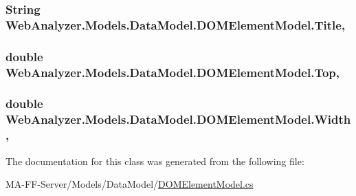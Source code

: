 \subsubsection[{Title}]{\setlength{\rightskip}{0pt plus 5cm}String Web\+Analyzer.\+Models.\+Data\+Model.\+D\+O\+M\+Element\+Model.\+Title\hspace{0.3cm}{\ttfamily [get]}, {\ttfamily [set]}}\label{class_web_analyzer_1_1_models_1_1_data_model_1_1_d_o_m_element_model_a10a1c3ec9fceca5b4745cae7f9647c74}
\hypertarget{class_web_analyzer_1_1_models_1_1_data_model_1_1_d_o_m_element_model_a1f17dcaf6e924292f3b6a8ade726941d}{}
\subsubsection[{Top}]{\setlength{\rightskip}{0pt plus 5cm}double Web\+Analyzer.\+Models.\+Data\+Model.\+D\+O\+M\+Element\+Model.\+Top\hspace{0.3cm}{\ttfamily [get]}, {\ttfamily [set]}}\label{class_web_analyzer_1_1_models_1_1_data_model_1_1_d_o_m_element_model_a1f17dcaf6e924292f3b6a8ade726941d}
\hypertarget{class_web_analyzer_1_1_models_1_1_data_model_1_1_d_o_m_element_model_a34aa9812237c151017294753a8ee77a7}{}
\subsubsection[{Width}]{\setlength{\rightskip}{0pt plus 5cm}double Web\+Analyzer.\+Models.\+Data\+Model.\+D\+O\+M\+Element\+Model.\+Width\hspace{0.3cm}{\ttfamily [get]}, {\ttfamily [set]}}\label{class_web_analyzer_1_1_models_1_1_data_model_1_1_d_o_m_element_model_a34aa9812237c151017294753a8ee77a7}


The documentation for this class was generated from the following file\+:\begin{DoxyCompactItemize}
\item 
M\+A-\/\+F\+F-\/\+Server/\+Models/\+Data\+Model/\hyperlink{_d_o_m_element_model_8cs}{D\+O\+M\+Element\+Model.\+cs}\end{DoxyCompactItemize}
